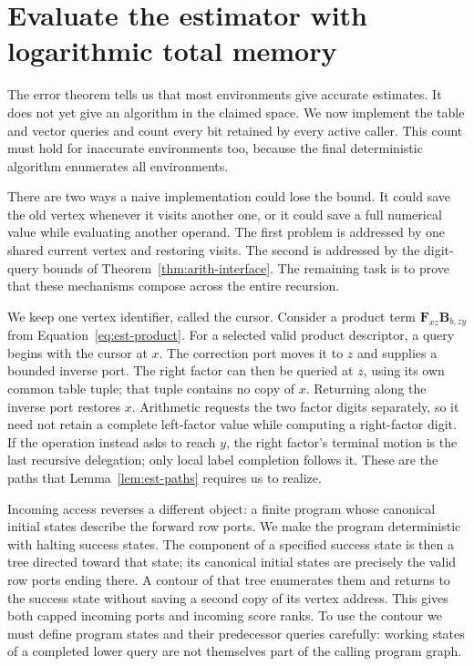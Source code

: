 \documentclass[11pt]{article}
\numberwithin{equation}{section}
\theoremstyle{definition}
\theoremstyle{remark}
\begin{document}
\section{Evaluate the estimator with logarithmic total memory}\label{sec:ctrl}

The error theorem tells us that most environments give accurate estimates. It does not yet give an algorithm in the claimed space. We now implement the table and vector queries and count every bit retained by every active caller. This count must hold for inaccurate environments too, because the final deterministic algorithm enumerates all environments.

There are two ways a naive implementation could lose the bound. It could save the old vertex whenever it visits another one, or it could save a full numerical value while evaluating another operand. The first problem is addressed by one shared current vertex and restoring visits. The second is addressed by the digit-query bounds of Theorem~\ref{thm:arith-interface}. The remaining task is to prove that these mechanisms compose across the entire recursion.

We keep one vertex identifier, called the cursor.  Consider a product term
${\mathbf{F}}_{xz}{\mathbf{B}}_{b,zy}$ from
Equation~\eqref{eq:est-product}.  For a selected valid product descriptor, a query begins with the cursor
at $x$.
The correction port moves it to $z$ and supplies a bounded inverse port.
The right factor can then be queried at $z$, using its own common table
tuple; that tuple contains no copy of $x$.  Returning along the inverse
port restores $x$.  Arithmetic requests the two factor digits separately,
so it need not retain a complete left-factor value while computing a
right-factor digit.  If the operation instead asks to reach $y$, the
right factor's terminal motion is the last recursive delegation; only
local label completion follows it.  These are the paths that
Lemma~\ref{lem:est-paths} requires us to realize.

Incoming access reverses a different object: a finite program whose
canonical initial states describe the forward row ports.  We make the
program deterministic with halting success states.  The component of a
specified success state is then a tree directed toward that state; its
canonical initial states are precisely the valid row ports ending there.  A contour of that tree enumerates them and returns to
the success state without saving a second copy of its vertex address.  This gives both
capped incoming ports and incoming score ranks.  To use the contour we
must define program states and their predecessor queries carefully:
working states of a completed lower query are not themselves part of
the calling program graph.
\end{document}
